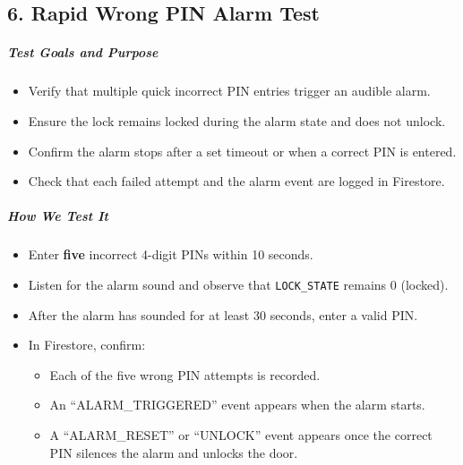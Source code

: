 \newpage
\begin{samepage}
    \subsection*{6. Rapid Wrong PIN Alarm Test}
    
    \subparagraph{Test Goals and Purpose}
    \begin{itemize}
        \item Verify that multiple quick incorrect PIN entries trigger an audible alarm.
        \item Ensure the lock remains locked during the alarm state and does not unlock.
        \item Confirm the alarm stops after a set timeout or when a correct PIN is entered.
        \item Check that each failed attempt and the alarm event are logged in Firestore.
    \end{itemize}
    
    \subparagraph{How We Test It}
    \begin{itemize}
        \item Enter \textbf{five} incorrect 4-digit PINs within 10 seconds.
        \item Listen for the alarm sound and observe that \texttt{LOCK\_STATE} remains 0 (locked).
        \item After the alarm has sounded for at least 30 seconds, enter a valid PIN.
        \item In Firestore, confirm:
        \begin{itemize}
            \item Each of the five wrong PIN attempts is recorded.
            \item An “ALARM\_TRIGGERED” event appears when the alarm starts.
            \item A “ALARM\_RESET” or “UNLOCK” event appears once the correct PIN silences the alarm and unlocks the door.
        \end{itemize}
    \end{itemize}


\end{samepage}
